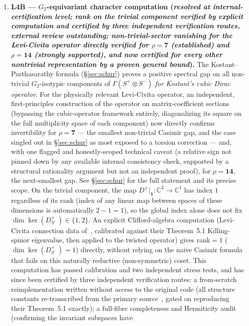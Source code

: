 \documentclass[12pt,a4paper]{article}
\newcommand{\CC}{\mathbb{C}}
\begin{document}
\begin{enumerate}
\item \textbf{L4B --- $G_2$-equivariant character computation (\emph{resolved at
  internal-certification level; rank on the trivial component verified by explicit
  computation and certified by three independent verification routes, external review
  outstanding; non-trivial-sector vanishing for the Levi-Civita operator directly
  verified for $\rho=\mathbf{7}$ (established) and $\rho=\mathbf{14}$ (strongly supported),
  and now certified for every other nontrivial representation by a proven general bound}).}
  The Kostant--Parthasarathy formula (\S\ref{sec:schur}) proves a positive spectral gap on
  all non-trivial $G_2$-isotypic components of $\Gamma(S^+\otimes S^-)$ \emph{for Kostant's
  cubic Dirac operator}. For the physically relevant Levi-Civita operator, an independent,
  first-principles construction of the operator on matrix-coefficient sections (bypassing the
  cubic-operator framework entirely, diagonalizing its square on the full multiplicity space of
  each component) now directly confirms invertibility for $\rho=\mathbf{7}$ --- the smallest
  non-trivial Casimir gap, and the case singled out in \S\ref{sec:schur} as most exposed to a
  torsion correction --- and, with one flagged and honestly-scoped technical caveat (a relative
  sign not pinned down by any available internal consistency check, supported by a structural
  rationality argument but not an independent proof), for $\rho=\mathbf{14}$, the next-smallest
  gap. See \S\ref{sec:schur} for the full statement and its precise scope. On the trivial
  component, the map $D^+|_{\mathbf 1}:\CC^2\to\CC^1$ has index $1$ regardless of its rank
  (index of any linear map between spaces of these dimensions is automatically $2-1=1$), so the
  global index alone does not fix $\dim\ker(D^+_{S^-})\in\{1,2\}$. An explicit Clifford-algebra
  computation (Levi-Civita connection data of~\cite{AgrHofLawn2023}, calibrated against their
  Theorem~5.1 Killing-spinor eigenvalue, then applied to the twisted operator) gives rank$=1$
  ($\dim\ker(D^+_{S^-})=1$) directly, without relying on the naive Casimir formula that fails
  on this naturally reductive (non-symmetric) coset. This computation has passed calibration
  and two independent stress tests, and has since been certified by three independent
  verification routes: a from-scratch reimplementation written without access to the
  original code (all structure constants re-transcribed from the primary
  source~\cite{AgrHofLawn2023}, gated on reproducing their Theorem~5.1 exactly); a
  full-fibre completeness and Hermiticity audit (confirming the invariant subspaces have

\end{enumerate}
\end{document}
